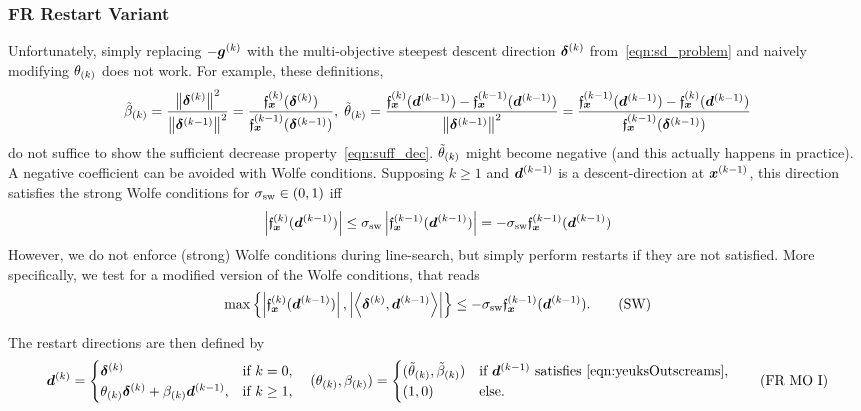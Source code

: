 \documentclass{article}
\theoremstyle{plain}
\theoremstyle{definition}
\begin{document}
\subsubsection*{FR Restart Variant}
Unfortunately, simply replacing $-\bm{g}^{(k)}$ 
with the multi-objective steepest descent direction
$\bm{\delta}^{(k)}$ from~\eqref{eqn:sd_problem} and naively modifying 
$\theta_{(k)}$ does not work.
For example, these definitions,
\begin{equation}
	\tilde{\beta}_{(k)} 
	= 
	\frac{
		\left\|\bm{\delta}^{(k)}\right\|^2
	}{
		\left\|\bm{\delta}^{(k-1)}\right\|^2
	}
	=
	\frac{\mathfrak{f}_{\bm{x}}^{(k)}(\bm{\delta}^{(k)})}{\mathfrak{f}_{\bm{x}}^{(k-1)}(\bm{\delta}^{(k-1)})},
	\;
	\tilde{\theta}_{(k)}
	=
	\frac{
		\mathfrak{f}_{\bm{x}}^{(k)}(\bm{d}^{(k-1)})
		-
		\mathfrak{f}_{\bm{x}}^{(k-1)}(\bm{d}^{(k-1)})
	}{
		\left\|\bm{\delta}^{(k-1)}\right\|^2
	}
	=
	\frac{
		\mathfrak{f}_{\bm{x}}^{(k-1)}(\bm{d}^{(k-1)})
		-
		\mathfrak{f}_{\bm{x}}^{(k)}(\bm{d}^{(k-1)})
	}{
		\mathfrak{f}_{\bm{x}}^{(k-1)}(\bm{\delta}^{(k-1)})
	}
	\label{eqn:hyposulphurousTontiners}
\end{equation}
do not suffice to show the sufficient decrease property~\eqref{eqn:suff_dec}.
$\tilde{\theta}_{(k)}$ might become negative (and this actually happens in practice).
A negative coefficient can be avoided with Wolfe conditions.
Supposing $k \geq 1$ and $\bm{d}^{(k-1)}$ is a descent-direction at $\bm{x}^{(k-1)}$,
this direction satisfies the strong Wolfe conditions for 
$\sigma_{\text{sw}} \in (0,1)$ iff
\begin{equation*}
	\left|\mathfrak{f}_{\bm{x}}^{(k)}(\bm{d}^{(k-1)})\right|
	\leq
	\sigma_{\text{sw}} \left|\mathfrak{f}_{\bm{x}}^{(k-1)}(\bm{d}^{(k-1)})\right|
	=
	-\sigma_{\text{sw}}\mathfrak{f}_{\bm{x}}^{(k-1)}(\bm{d}^{(k-1)})
\end{equation*}
However, we do not enforce (strong) Wolfe conditions during line-search,
but simply perform restarts if they are not satisfied.
More specifically, we test for a modified version of the Wolfe conditions, 
that reads
\begin{equation}
	\max\left\{
		\left|\mathfrak{f}_{\bm{x}}^{(k)}(\bm{d}^{(k-1)})\right|,
		\left|\left\langle \bm{\delta}^{(k)}, \bm{d}^{(k-1)} \right\rangle\right|
	\right\}
	\leq
	-\sigma_{\text{sw}}\mathfrak{f}_{\bm{x}}^{(k-1)}(\bm{d}^{(k-1)}).
	\tag{SW}
	\label{eqn:yeuksOutscreams}
\end{equation}

The restart directions are then defined by
\begin{equation}
	\bm{d}^{(k)}
	=
	\begin{cases}
		\bm{\delta}^{(k)}
		&\text{if $k = 0$},
		\\
		\theta_{(k)} \bm{\delta}^{(k)} + \beta_{(k)} \bm{d}^{(k-1)},
		&\text{if $k \geq 1$,}
	\end{cases}
	\quad
	(\theta_{(k)}, \beta_{(k)})
	= 
	\begin{cases}	
		(\tilde\theta_{(k)}, \tilde\beta_{(k)})
		&\text{if $\bm{d}^{(k-1)}$ satisfies \eqref{eqn:yeuksOutscreams},}
		\\
		(1, 0)
		&\text{else.}
	\end{cases}
	\tag{FR~MO~I}
	\label{eqn:frMO1}
\end{equation}
\end{document}
